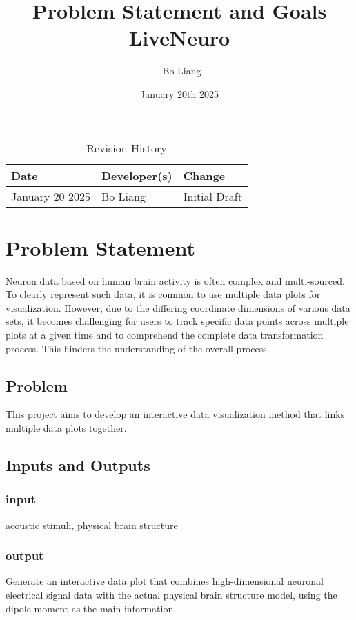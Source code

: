 \documentclass{article}
\title{Problem Statement and Goals\\LiveNeuro}
\author{\ Bo Liang}
\date{January 20th 2025}
\begin{document}
\maketitle

\begin{table}[hp]
\caption{Revision History} \label{TblRevisionHistory}
\begin{tabularx}{\textwidth}{llX}
\toprule
\textbf{Date} & \textbf{Developer(s)} & \textbf{Change}\\
\midrule
January 20 2025 & Bo Liang & Initial Draft\\
\bottomrule
\end{tabularx}
\end{table}

\section{Problem Statement}

Neuron data based on human brain activity is often complex and multi-sourced. To clearly represent such data, it is common to use multiple data plots for visualization. However, due to the differing coordinate dimensions of various data sets, it becomes challenging for users to track specific data points across multiple plots at a given time and to comprehend the complete data transformation process. This hinders the understanding of the overall process.

\subsection{Problem}
This project aims to develop an interactive data visualization method that links multiple data plots together.
\subsection{Inputs and Outputs}
\subsubsection{input}
acoustic stimuli, physical brain structure
\subsubsection{output}

Generate an interactive data plot that combines high-dimensional neuronal electrical signal data with the actual physical brain structure model, using the dipole moment as the main information.
\end{document}

